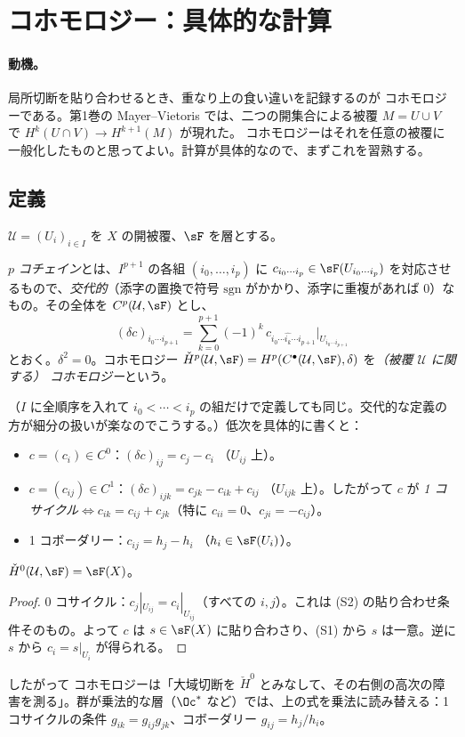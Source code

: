 \section{\Cech{} コホモロジー：具体的な計算}\label{sec:cech}

\paragraph{動機。}局所切断を貼り合わせるとき、重なり上の食い違いを記録するのが \Cech{} コホモロジーである。第1巻の Mayer--Vietoris では、二つの開集合による被覆 $M=U\cup V$ で $H^k(U\cap V)\to H^{k+1}(M)$ が現れた。\Cech{} コホモロジーはそれを任意の被覆に一般化したものと思ってよい。計算が具体的なので、まずこれを習熟する。

\subsection{定義}
$\mathcal U=(U_i)_{i\in I}$ を $X$ の開被覆、$\sF$ を層とする。
\begin{defn}[\Cech{} 複体]
$p$ \emph{コチェイン}とは、$I^{p+1}$ の各組 $(i_0,\dots,i_p)$ に $c_{i_0\cdots i_p}\in\sF(U_{i_0\cdots i_p})$ を対応させるもので、\emph{交代的}（添字の置換で符号 $\mathrm{sgn}$ がかかり、添字に重複があれば $0$）なもの。その全体を $C^p(\mathcal U,\sF)$ とし、
\[
(\delta c)_{i_0\cdots i_{p+1}}=\sum_{k=0}^{p+1}(-1)^k\,c_{i_0\cdots\widehat{i_k}\cdots i_{p+1}}\Big|_{U_{i_0\cdots i_{p+1}}}
\]
とおく。$\delta^2=0$。コホモロジー $\check H^p(\mathcal U,\sF)=H^p(C^\bullet(\mathcal U,\sF),\delta)$ を\emph{（被覆 $\mathcal U$ に関する）\Cech{} コホモロジー}という。
\end{defn}
（$I$ に全順序を入れて $i_0<\cdots<i_p$ の組だけで定義しても同じ。交代的な定義の方が細分の扱いが楽なのでこうする。）低次を具体的に書くと：
\begin{itemize}
\item $c=(c_i)\in C^0$：$(\delta c)_{ij}=c_j-c_i$ （$U_{ij}$ 上）。
\item $c=(c_{ij})\in C^1$：$(\delta c)_{ijk}=c_{jk}-c_{ik}+c_{ij}$ （$U_{ijk}$ 上）。したがって $c$ が \emph{1 コサイクル}$\iff c_{ik}=c_{ij}+c_{jk}$（特に $c_{ii}=0$、$c_{ji}=-c_{ij}$）。
\item 1 コボーダリー：$c_{ij}=h_j-h_i$ （$h_i\in\sF(U_i)$）。
\end{itemize}
\begin{prop}\label{prop:cechH0}\tP
$\check H^0(\mathcal U,\sF)=\sF(X)$。
\end{prop}
\begin{proof}
0 コサイクル：$c_j|_{U_{ij}}=c_i|_{U_{ij}}$（すべての $i,j$）。これは (S2) の貼り合わせ条件そのもの。よって $c$ は $s\in\sF(X)$ に貼り合わさり、(S1) から $s$ は一意。逆に $s$ から $c_i=s|_{U_i}$ が得られる。\qedhere
\end{proof}
したがって \Cech{} コホモロジーは「大域切断を $\check H^0$ とみなして、その右側の高次の障害を測る」。群が乗法的な層（$\Oc^*$ など）では、上の式を乗法に読み替える：1 コサイクルの条件 $g_{ik}=g_{ij}g_{jk}$、コボーダリー $g_{ij}=h_j/h_i$。

